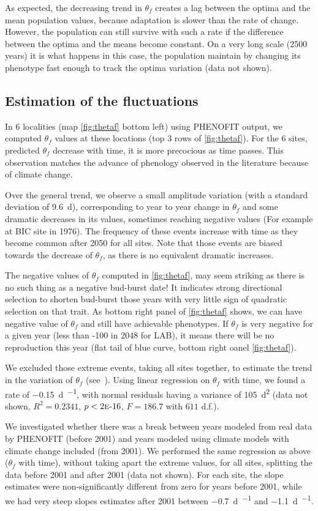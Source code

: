 As expected, the decreasing trend in $\theta_f$ creates a lag between the optima and the mean population values, because adaptation is slower than the rate of change. However, the population can still survive with such a rate if the difference between the optima and the means become constant. On a very long scale (2500 years) it is what happens in this case, the population maintain by changing its phenotype fast enough to track the optima variation (data not shown).

\subsection*{Estimation of the fluctuations}

In 6 localities (map \autoref{fig:thetaf} bottom left) using \textsc{PHENOFIT} output, we computed $\theta_f$ values at these locations (top 3 rows of \autoref{fig:thetaf}). For the 6 sites, predicted $\theta_f$ decrease with time, it is more precocious as time passes. This observation matches the advance of phenology observed in the literature because of climate change.

Over the general trend, we observe a small amplitude variation (with a standard deviation of \SI{9.6}{\day}), corresponding to year to year change in $\theta_f$ and some dramatic decreases in its values, sometimes reaching negative values (For example at BIC site in 1976). The frequency of these events increase with time as they become common after 2050 for all sites. Note that those events are biased towards the decrease of $\theta_f$, as there is no equivalent dramatic increases.

The negative values of $\theta_f$ computed in \autoref{fig:thetaf}, may seem striking as there is no such thing as a negative bud-burst date! It indicates strong directional selection to shorten bud-burst those years with very little sign of quadratic selection on that trait. As bottom right panel of \autoref{fig:thetaf} shows, we can have negative value of $\theta_f$ and still have achievable phenotypes. If $\theta_f$ is very negative for a given year (less than -100 in 2048 for LAB), it means there will be no reproduction this year (flat tail of blue curve, bottom right oanel \autoref{fig:thetaf}).

We excluded those extreme events, taking all sites together, to estimate the trend in the variation of $\theta_f$ (see~). Using linear regression on $\theta_f$ with time, we found a rate of \SI{-0.15}{\day\per\year}, with normal residuals having a variance of \SI{105}{\day\squared} (data not shown, $R^2=0.2341$, $p<2\text{\sc{e}-}16$, $F=186.7$ with $611$ d.f.).

We investigated whether there was a break between years modeled from real data by \textsc{PHENOFIT} (before 2001) and years modeled using climate models with climate change included (from 2001). We performed the same regression as above ($\theta_f$ with time), without taking apart the extreme values, for all sites, splitting the data before 2001 and after 2001 (data not shown). For each site, the slope estimates were non-significantly different from zero for years before 2001, while we had very steep slopes estimates after 2001 between \SI{-0.7}{\day\per\year} and \SI{-1.1}{\day\per\year}.